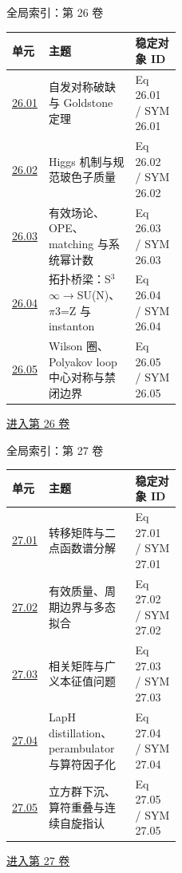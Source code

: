 \documentclass[aspectratio=169,10pt]{ctexbeamer}
\begin{document}
\begin{frame}[t]{全局索引：第 26 卷}
\small\begin{tabularx}{\linewidth}{p{0.15\linewidth}Yp{0.27\linewidth}}
\toprule 单元 & 主题 & 稳定对象 ID\\\midrule
\hyperlink{Fr:26.01-1}{26.01} & 自发对称破缺与 Goldstone 定理 & Eq 26.01 / SYM 26.01\\
\hyperlink{Fr:26.02-1}{26.02} & Higgs 机制与规范玻色子质量 & Eq 26.02 / SYM 26.02\\
\hyperlink{Fr:26.03-1}{26.03} & 有效场论、OPE、matching 与系统幂计数 & Eq 26.03 / SYM 26.03\\
\hyperlink{Fr:26.04-1}{26.04} & 拓扑桥梁：S\ensuremath{^{3}}\ensuremath{\infty}\ensuremath{\rightarrow}SU(N)、\ensuremath{\pi}3=Z 与 instanton & Eq 26.04 / SYM 26.04\\
\hyperlink{Fr:26.05-1}{26.05} & Wilson 圈、Polyakov loop 中心对称与禁闭边界 & Eq 26.05 / SYM 26.05\\
\bottomrule\end{tabularx}
\vfill\hyperlink{Fr:V26-title}{进入第 26 卷}
\end{frame}

\begin{frame}[t]{全局索引：第 27 卷}
\small\begin{tabularx}{\linewidth}{p{0.15\linewidth}Yp{0.27\linewidth}}
\toprule 单元 & 主题 & 稳定对象 ID\\\midrule
\hyperlink{Fr:27.01-1}{27.01} & 转移矩阵与二点函数谱分解 & Eq 27.01 / SYM 27.01\\
\hyperlink{Fr:27.02-1}{27.02} & 有效质量、周期边界与多态拟合 & Eq 27.02 / SYM 27.02\\
\hyperlink{Fr:27.03-1}{27.03} & 相关矩阵与广义本征值问题 & Eq 27.03 / SYM 27.03\\
\hyperlink{Fr:27.04-1}{27.04} & LapH distillation、perambulator 与算符因子化 & Eq 27.04 / SYM 27.04\\
\hyperlink{Fr:27.05-1}{27.05} & 立方群下沉、算符重叠与连续自旋指认 & Eq 27.05 / SYM 27.05\\
\bottomrule\end{tabularx}
\vfill\hyperlink{Fr:V27-title}{进入第 27 卷}
\end{frame}
\end{document}
